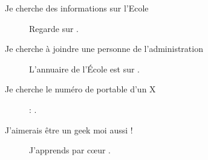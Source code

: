 \begin{description}
\item[Je cherche des informations sur l'Ecole] Regarde sur .

\item[Je cherche à joindre une personne de l'administration] L'annuaire de l'École est sur .

\item[Je cherche le numéro de portable d'un X] : .

\item[J'aimerais être un geek moi aussi !] J'apprends par c\oe ur .

\end{description}
